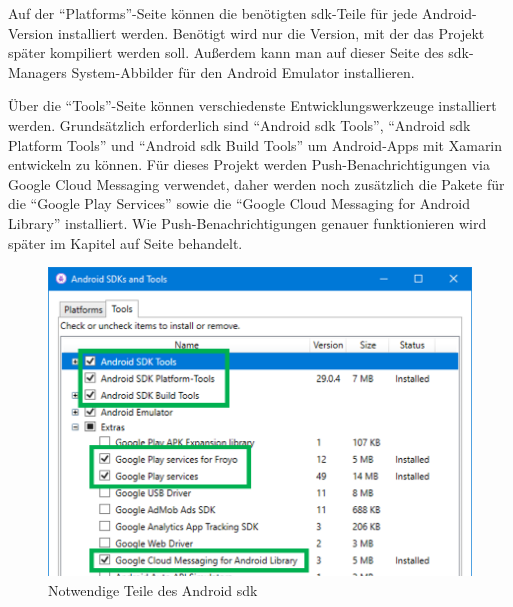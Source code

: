 Auf der \enquote{Plat\-forms}-Seite können die benötigten \ac{sdk}-Teile für jede Android-Version installiert werden.
Benötigt wird nur die Version, mit der das Projekt später kompiliert werden soll.
Außerdem kann man auf dieser Seite des \ac{sdk}-Managers System-Abbilder für den Android Emulator installieren.\par

Über die \enquote{Tools}-Seite können verschiedenste Entwicklungswerkzeuge installiert werden.
Grundsätzlich erforderlich sind \enquote{Android \acs{sdk} Tools}, \enquote{Android \acs{sdk} Platform Tools} und \enquote{Android \acs{sdk} Build Tools} um Android-Apps mit Xamarin entwickeln zu können.
Für dieses Projekt werden Push-Benachrichtigungen via Google Cloud Messaging verwendet, daher werden noch zusätzlich die Pakete für die \enquote{Google Play Services} sowie die \enquote{Google Cloud Messaging for Android Library} installiert.
Wie Push-Benachrichtigungen genauer funktionieren wird später im Kapitel  auf Seite \pageref{ch:push} behandelt.
\begin{figure}[H]
    \centering\includegraphics[width=0.8\linewidth]{images/auswahl_rahmenwerk/android_sdk_auswahl.png}    
    \caption{Notwendige Teile des Android \acs{sdk}}
\end{figure}

